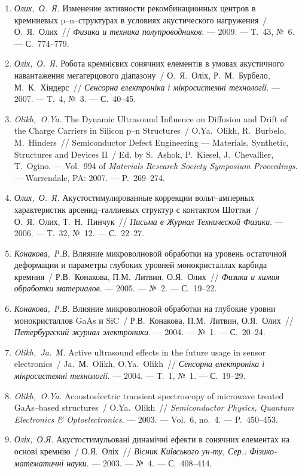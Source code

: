 \begin{enumerate}[label=\arabic*.,leftmargin=1cm,itemindent=0cm]
\item 
\emph{Олих,~О.~Я.} Изменение активности
  рекомбинационных центров в кремниевых
  p--n--структурах в условиях акустического
  нагружения~/ О.~Я.~Олих~// \emph{Физика и
  техника полупроводников}. ---
  2009. ---
  Т.~43, {№}~6. ---
  {С.}~774--779.

\item 
\emph{Оліх,~О.~Я.} Робота кремнієвих сонячних
  елементів в умовах акустичного
  навантаження мегагерцового діапазону~/
  О.~Я.~Оліх, Р.~М.~Бурбело, М.~К.~Хіндерс~//
  \emph{Сенсорна електроніка і
  мікросистемні технології}. ---
  2007. ---
  Т.~4, {№}~3. ---
  {С.}~40--45.

\item 
\emph{Olikh,~O.Ya.} The Dynamic Ultrasound Influence on Diffusion and Drift
  of the Charge Carriers in Silicon p--n Structures~/ O.Ya.~Olikh, R.~Burbelo,
  M.~Hinders~// Semiconductor Defect Engineering --- Materials, Synthetic,
  Structures and Devices II~/ Ed. by S.~Ashok, P.~Kiesel, J.~Chevallier,
  T.~Ogino. ---
  Vol.~994 of \emph{Materials Research Society Symposium
  Proceedings}. ---
  Warrendale, PA: 2007. ---
  P.~269--274.

\item 
\emph{Олих,~О.~Я.} Акустостимулированные
  коррекции вольт--амперных характеристик
  арсенид--галлиевых структур с контактом
  {Ш}оттки~/ О.~Я.~Олих, Т.~Н.~Пинчук~//
  \emph{Письма в Журнал Технической Физики}.
  ---
  2006. ---
  Т.~32, {№}~12. ---
  {С.}~22--27.

\item 
\emph{Конакова,~Р.В.} Влияние микроволновой
  обработки на уровень остаточной
  деформации и параметры глубоких уровней
  монокристаллах карбида кремния~/
  Р.В.~Конакова, П.М.~Литвин, О.Я.~Олих~//
  \emph{Физика и химия обработки материалов}.
  ---
  2005. ---
  {№}~2. ---
  {С.}~19--22.


\item 
\emph{Конакова,~Р.В.} Влияние микроволновой
  обработки на глубокие уровни
  монокристаллов {G}a{A}s и {S}i{C}~/ Р.В.~Конакова,
  П.М.~Литвин, О.Я.~Олих~// \emph{Петербургский
  журнал электроники}. ---
  2004. ---
  {№}~1. ---
  {С.}~20--24.

\item 
\emph{Olikh,~Ja.~М.} Active ultrasound effects in the future usage in
  sensor electronics~/ Ja.~М.~Olikh, O.Ya.~Olikh~// \emph{Сенсорна
  електроніка і мікросистемні технології}.
  ---
  2004. ---
  Т.~1, {№}~1. ---
  {С.}~19--29.

\item 
\emph{Olikh,~O.Ya.} Acoustoelectric transient spectroscopy of microwave
  treated {G}a{A}s--based structures~/ O.Ya.~Olikh~// \emph{Semiconductor
  Physics, Quantum Electronics \& Optoelectronics}. ---
  2003. ---
  Vol.~6, no.~4. ---
  P.~450--453.

\item 
\emph{Оліх,~О.Я.} Акустостимульовані
  динамічні ефекти в сонячних елементах на
  основі кремнію~/ О.Я.~Оліх~// \emph{Вісник
  Київського ун-ту, Сер.: Фізико-математичні
  науки}. ---
  2003. ---
  {№}~4. ---
  {С.}~408--414.

\end{enumerate}
